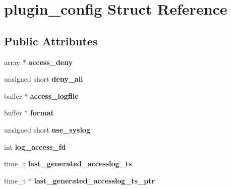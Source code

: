\hypertarget{structplugin__config}{
\section{plugin\_\-config Struct Reference}
\label{structplugin__config}
}
\subsection*{Public Attributes}
\begin{CompactItemize}
\item 
\hypertarget{structplugin__config_f503027bbb7fb2345bf6ac966a3f94d4}{
array $\ast$ \textbf{access\_\-deny}}
\label{structplugin__config_f503027bbb7fb2345bf6ac966a3f94d4}

\item 
\hypertarget{structplugin__config_d64be108cd5d2f0cbbb1bbf6987a4261}{
unsigned short \textbf{deny\_\-all}}
\label{structplugin__config_d64be108cd5d2f0cbbb1bbf6987a4261}

\item 
\hypertarget{structplugin__config_9f49dacad1547afc5c4f342e2785b890}{
buffer $\ast$ \textbf{access\_\-logfile}}
\label{structplugin__config_9f49dacad1547afc5c4f342e2785b890}

\item 
\hypertarget{structplugin__config_f1cea69ff3a5d21625609be6668fa138}{
buffer $\ast$ \textbf{format}}
\label{structplugin__config_f1cea69ff3a5d21625609be6668fa138}

\item 
\hypertarget{structplugin__config_0550af5388be0c53c8e7d608ab13223a}{
unsigned short \textbf{use\_\-syslog}}
\label{structplugin__config_0550af5388be0c53c8e7d608ab13223a}

\item 
\hypertarget{structplugin__config_c2cfe959ecfdb9e94aa13fb163c58e85}{
int \textbf{log\_\-access\_\-fd}}
\label{structplugin__config_c2cfe959ecfdb9e94aa13fb163c58e85}

\item 
\hypertarget{structplugin__config_e3bcf96bb33e24cd8757fc9a4c90825b}{
time\_\-t \textbf{last\_\-generated\_\-accesslog\_\-ts}}
\label{structplugin__config_e3bcf96bb33e24cd8757fc9a4c90825b}

\item 
\hypertarget{structplugin__config_d23655083ebea6a8d9f9a21c9827c7e7}{
time\_\-t $\ast$ \textbf{last\_\-generated\_\-accesslog\_\-ts\_\-ptr}}
\label{structplugin__config_d23655083ebea6a8d9f9a21c9827c7e7}


\end{CompactItemize}
